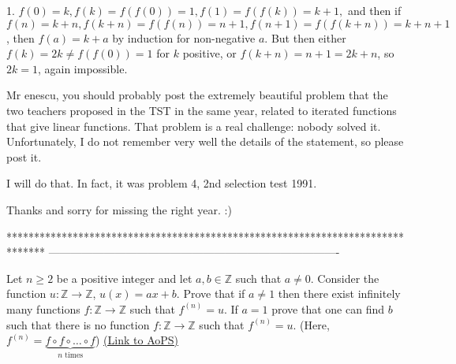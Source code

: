 \begin{solution}
	1. $f(0)=k, f(k)=f(f(0))=1, f(1)=f(f(k))=k+1,$ and then if $f(n)=k+n, f(k+n)=f(f(n))=n+1, f(n+1)=f(f(k+n))=k+n+1$, then $f(a)=k+a$ by induction for non-negative $a$. But then either $f(k)=2k \neq f(f(0))=1$ for $k$ positive, or $f(k+n)=n+1=2k+n$, so $2k=1$, again impossible.
\end{solution}



\begin{solution}
	Mr enescu, you should probably post the extremely beautiful problem that the two teachers proposed in the TST in the same year, related to iterated functions that give linear functions. That problem is a real challenge: nobody solved it. Unfortunately, I do not remember very well the details of the statement, so please post it.
\end{solution}



\begin{solution}
	I will do that. In fact, it was problem 4, 2nd selection test 1991.
\end{solution}



\begin{solution}
	Thanks and sorry for missing the right year.  :)
\end{solution}
*******************************************************************************
-------------------------------------------------------------------------------

\begin{problem}
	Let $n\ge 2$ be a positive integer and let $a,b\in \mathbb {Z}$ such that $a\ne 0$. Consider the function $u:\mathbb {Z}\rightarrow \mathbb {Z}$, $u(x)=ax+b.$
Prove that if $a\ne 1$ then there exist infinitely many functions $f:\mathbb {Z}\rightarrow \mathbb {Z}$ such that $f^{(n)}=u$.
If $a=1$ prove that one can find $b$ such that there is no function   $f:\mathbb {Z}\rightarrow \mathbb {Z}$ such that $f^{(n)}=u$.
(Here, $f^{(n)}=\underset{n\text{ times}}{\underbrace{f\circ f\circ \ldots \circ f}}$)
	\flushright \href{https://artofproblemsolving.com/community/c6h28117}{(Link to AoPS)}
\end{problem}



